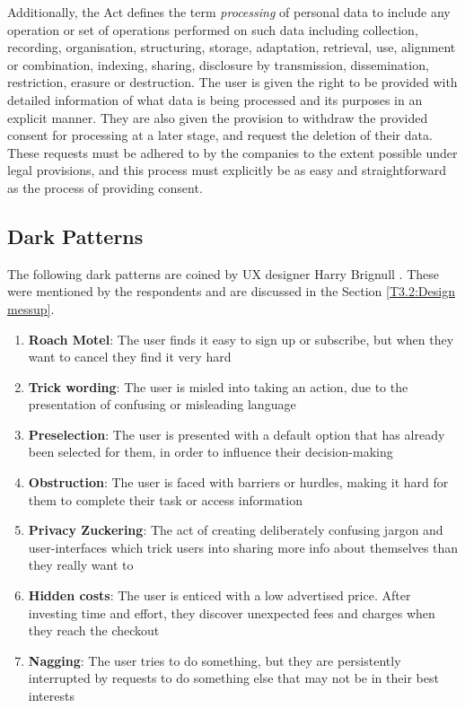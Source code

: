 Additionally, the Act defines the term \textit{processing} of personal data to include any operation or set of operations performed on such data including collection, recording, organisation, structuring, storage, adaptation, retrieval, use, alignment or combination, indexing, sharing, disclosure by transmission, dissemination, restriction, erasure or destruction. The user is given the right to be provided with detailed information of what data is being processed and its purposes in an explicit manner. They are also given the provision to withdraw the provided consent for processing at a later stage, and request the deletion of their data. These requests must be adhered to by the companies to the extent possible under legal provisions, and this process must explicitly be as easy and straightforward as the process of providing consent. 

\subsection{Dark Patterns} \label{subsec:dark patterns}

The following dark patterns are coined by UX designer Harry Brignull \cite{brignull-leiser-2026} \cite{brignull-old}. These were mentioned by the respondents and are discussed in the Section \ref{T3.2:Design messup}.

\begin{enumerate}
    \item \textbf{Roach Motel}: The user finds it easy to sign up or subscribe, but when they want to cancel they find it very hard
    \item \textbf{Trick wording}: The user is misled into taking an action, due to the presentation of confusing or misleading language
    \item \textbf{Preselection}: The user is presented with a default option that has already been selected for them, in order to influence their decision-making
    \item \textbf{Obstruction}: The user is faced with barriers or hurdles, making it hard for them to complete their task or access information
    \item \textbf{Privacy Zuckering}: The act of creating deliberately confusing jargon and user-interfaces which trick users into sharing more info about themselves than they really want to
    \item \textbf{Hidden costs}: The user is enticed with a low advertised price. After investing time and effort, they discover unexpected fees and charges when they reach the checkout
    \item \textbf{Nagging}: The user tries to do something, but they are persistently interrupted by requests to do something else that may not be in their best interests
\end{enumerate}

